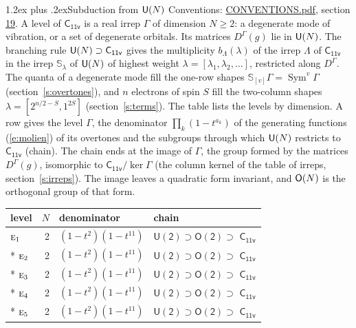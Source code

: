 \documentclass[10pt,a4paper]{article}
\makeatletter
\renewcommand\section{\@startsection{section}{1}{\z@}{-3ex plus -1ex minus -.2ex}%
  {1.2ex plus .2ex}{\normalfont\large\sffamily\bfseries\color{parttitle}}}
\numberwithin{equation}{section}
\newcommand{\grp}[1]{\mathsf{#1}}
\newcommand{\irr}[1]{\text{\normalfont\scshape #1}}
\newcommand{\repD}[1]{D^{#1}}
\newcommand{\schur}[1]{\mathbb{S}_{#1}}
\newcommand{\shape}[1]{[#1]}
\makeatother
\begin{document}
\section{Subduction from \texorpdfstring{$\grp{U(\mathnormal{N})}$}{U(N)}}\label{s:unitary}
Conventions: \href{../../CONVENTIONS.pdf}{CONVENTIONS.pdf}, section \href{../../CONVENTIONS.pdf\#conv.19}{19}.
\leavevmode\label{n:local.level.dimension}A level of $\grp{C_{11v}}$ is a real irrep $\Gamma$ of dimension $N \ge 2$: a degenerate mode of vibration, or a set of degenerate orbitals. \label{n:group.unitary}Its matrices $\repD{\Gamma}(g)$ lie in $\grp{U(\mathnormal{N})}$. \label{n:irrep.schur}\label{n:shape.partition}\label{n:local.partition}\label{n:function.multiplicity.unitary}The branching rule $\grp{U(\mathnormal{N})} \supset \grp{C_{11v}}$ gives the multiplicity $b_\Lambda(\lambda)$ of the irrep $\Lambda$ of $\grp{C_{11v}}$ in the irrep $\schur{\lambda}$ of $\grp{U(\mathnormal{N})}$ of highest weight $\lambda = \shape{\lambda_1, \lambda_2, \dots}$, restricted along $\repD{\Gamma}$. \label{n:local.partition.power}\label{n:local.electrons}\label{n:local.spin}The quanta of a degenerate mode fill the one-row shapes $\schur{\shape{v}}\Gamma = \operatorname{Sym}^{v}\Gamma$ (section~\ref{s:overtones}), and $n$ electrons of spin $S$ fill the two-column shapes $\lambda = \shape{2^{n/2-S}, 1^{2S}}$ (section~\ref{s:terms}).
The table lists the levels by dimension. \label{n:head.level}\label{n:head.denominator}\label{n:index.overtone.denominator}\label{n:head.chain}A row gives the level $\Gamma$, the denominator $\prod_k (1 - t^{a_k})$ of the generating functions (\ref{e:molien}) of its overtones and the subgroups through which $\grp{U(\mathnormal{N})}$ restricts to $\grp{C_{11v}}$ (chain). The chain ends at the image of $\Gamma$, the group formed by the matrices $\repD{\Gamma}(g)$, isomorphic to $\grp{C_{11v}}/\ker\Gamma$ (the column kernel of the table of irreps, section~\ref{s:irreps}). The image leaves a quadratic form invariant, and $\grp{O(\mathnormal{N})}$ is the orthogonal group of that form.
{\small\begin{longtable}{@{}lrll@{}}\toprule
level & $N$ & denominator & chain\\\midrule\endhead
\bottomrule\endfoot\endlastfoot
$\irr{e}_{1}$ & 2 & $(1-t^{2})(1-t^{11})$ & $\grp{U(2)} \supset \grp{O(2)} \supset$ \href{C11v.pdf}{$\grp{C_{11v}}$}\\*
$\irr{e}_{2}$ & 2 & $(1-t^{2})(1-t^{11})$ & $\grp{U(2)} \supset \grp{O(2)} \supset$ \href{C11v.pdf}{$\grp{C_{11v}}$}\\*
$\irr{e}_{3}$ & 2 & $(1-t^{2})(1-t^{11})$ & $\grp{U(2)} \supset \grp{O(2)} \supset$ \href{C11v.pdf}{$\grp{C_{11v}}$}\\*
$\irr{e}_{4}$ & 2 & $(1-t^{2})(1-t^{11})$ & $\grp{U(2)} \supset \grp{O(2)} \supset$ \href{C11v.pdf}{$\grp{C_{11v}}$}\\*
$\irr{e}_{5}$ & 2 & $(1-t^{2})(1-t^{11})$ & $\grp{U(2)} \supset \grp{O(2)} \supset$ \href{C11v.pdf}{$\grp{C_{11v}}$}\\
\bottomrule\end{longtable}}
\end{document}
